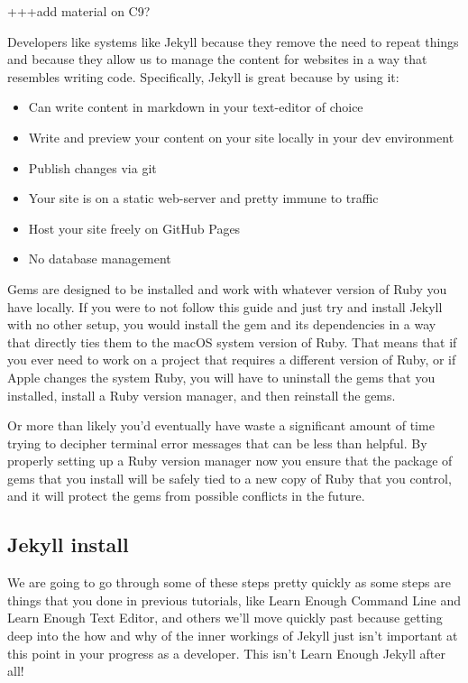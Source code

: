 +++add material on C9?

Developers like systems like Jekyll because they remove the need to repeat things and because they allow us to manage the content for websites in a way that resembles writing code. Specifically, Jekyll is great because by using it:

\begin{itemize}
\item Can write content in markdown in your text-editor of choice
\item Write and preview your content on your site locally in your dev environment
\item Publish changes via git
\item Your site is on a static web-server and pretty immune to traffic
\item Host your site freely on GitHub Pages
\item No database management
\end{itemize}

Gems are designed to be installed and work with whatever version of Ruby you have locally. If you were to not follow this guide and just try and install Jekyll with no other setup, you would install the gem and its dependencies in a way that directly ties them to the macOS system version of Ruby. That means that if you ever need to work on a project that requires a different version of Ruby, or if Apple changes the system Ruby, you will have to uninstall the gems that you installed, install a Ruby version manager, and then reinstall the gems.

Or more than likely you'd eventually have waste a significant amount of time trying to decipher terminal error messages that can be less than helpful. By properly setting up a Ruby version manager now you ensure that the package of gems that you install will be safely tied to a new copy of Ruby that you control, and it will protect the gems from possible conflicts in the future.

\subsection{Jekyll install}

\label{sec:jekyll-install}

We are going to go through some of these steps pretty quickly as some steps are things that you done in previous tutorials, like Learn Enough Command Line and Learn Enough Text Editor, and others we'll move quickly past because getting deep into the how and why of the inner workings of Jekyll just isn't important at this point in your progress as a developer. This isn't Learn Enough Jekyll after all!


